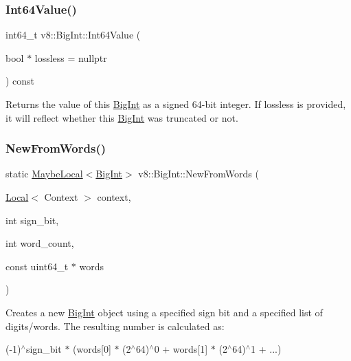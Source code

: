 \subsubsection{\texorpdfstring{Int64\+Value()}{Int64Value()}}
{\footnotesize\ttfamily int64\+\_\+t v8\+::\+Big\+Int\+::\+Int64\+Value (\begin{DoxyParamCaption}\item[{bool $\ast$}]{lossless = {\ttfamily nullptr} }\end{DoxyParamCaption}) const}

Returns the value of this \mbox{\hyperlink{classv8_1_1BigInt}{Big\+Int}} as a signed 64-\/bit integer. If {\ttfamily lossless} is provided, it will reflect whether this \mbox{\hyperlink{classv8_1_1BigInt}{Big\+Int}} was truncated or not. \mbox{\label{classv8_1_1BigInt_a2e315509efbc08fef90ef54d7e179e4d}} 
\subsubsection{\texorpdfstring{New\+From\+Words()}{NewFromWords()}}
{\footnotesize\ttfamily static \mbox{\hyperlink{classv8_1_1MaybeLocal}{Maybe\+Local}}$<$\mbox{\hyperlink{classv8_1_1BigInt}{Big\+Int}}$>$ v8\+::\+Big\+Int\+::\+New\+From\+Words (\begin{DoxyParamCaption}\item[{\mbox{\hyperlink{classv8_1_1Local}{Local}}$<$ Context $>$}]{context,  }\item[{int}]{sign\+\_\+bit,  }\item[{int}]{word\+\_\+count,  }\item[{const uint64\+\_\+t $\ast$}]{words }\end{DoxyParamCaption})\hspace{0.3cm}{\ttfamily [static]}}

Creates a new \mbox{\hyperlink{classv8_1_1BigInt}{Big\+Int}} object using a specified sign bit and a specified list of digits/words. The resulting number is calculated as\+:

(-\/1)$^\wedge$sign\+\_\+bit $\ast$ (words\mbox{[}0\mbox{]} $\ast$ (2$^\wedge$64)$^\wedge$0 + words\mbox{[}1\mbox{]} $\ast$ (2$^\wedge$64)$^\wedge$1 + ...) \mbox{\label{classv8_1_1BigInt_adbc582fd6ae26b6afe9b5591b5fe06e7}} 
